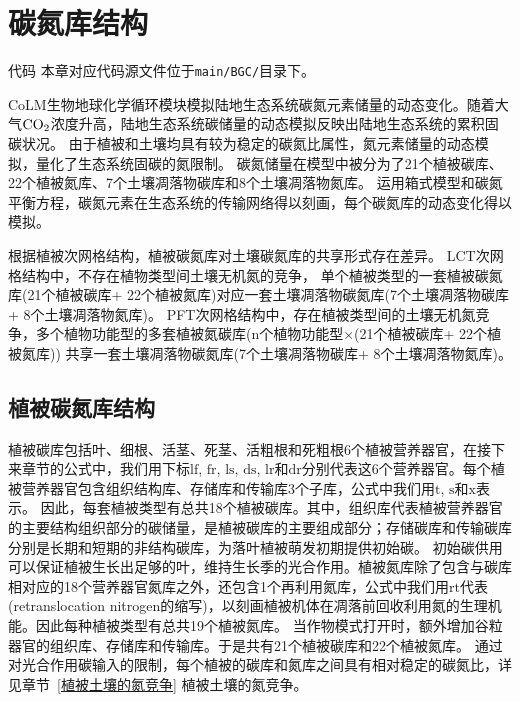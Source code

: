 \chapter{碳氮库结构}\label{碳氮库结构}
\begin{mymdframed}{代码}
  本章对应代码源文件位于\texttt{main/BGC/}目录下。
\end{mymdframed}

CoLM生物地球化学循环模块模拟陆地生态系统碳氮元素储量的动态变化。随着大气$\rm CO_2$浓度升高，陆地生态系统碳储量的动态模拟反映出陆地生态系统的累积固碳状况。
由于植被和土壤均具有较为稳定的碳氮比属性，氮元素储量的动态模拟，量化了生态系统固碳的氮限制。
碳氮储量在模型中被分为了21个植被碳库、22个植被氮库、7个土壤凋落物碳库和8个土壤凋落物氮库。
运用箱式模型和碳氮平衡方程，碳氮元素在生态系统的传输网络得以刻画，每个碳氮库的动态变化得以模拟。


根据植被次网格结构，植被碳氮库对土壤碳氮库的共享形式存在差异。
LCT次网格结构中，不存在植物类型间土壤无机氮的竞争，
单个植被类型的一套植被碳氮库(21个植被碳库+ 22个植被氮库)对应一套土壤凋落物碳氮库(7个土壤凋落物碳库+ 8个土壤凋落物氮库)。
PFT次网格结构中，存在植被类型间的土壤无机氮竞争，多个植物功能型的多套植被氮碳库(n个植物功能型×(21个植被碳库+ 22个植被氮库))
共享一套土壤凋落物碳氮库(7个土壤凋落物碳库+ 8个土壤凋落物氮库)。


\section{植被碳氮库结构}\label{植被碳氮库结构}
植被碳库包括叶、细根、活茎、死茎、活粗根和死粗根6个植被营养器官，在接下来章节的公式中，我们用下标${\mathrm {lf}}$, ${\mathrm {fr}}$, ${\mathrm {ls}}$, ${\mathrm {ds}}$, ${\mathrm {lr}}$和${\mathrm {dr}}$分别代表这6个营养器官。每个植被营养器官包含组织结构库、存储库和传输库3个子库，公式中我们用${\mathrm {t}}$, ${\mathrm {s}}$和${\mathrm {x}}$表示。
因此，每套植被类型有总共18个植被碳库。其中，组织库代表植被营养器官的主要结构组织部分的碳储量，是植被碳库的主要组成部分；存储碳库和传输碳库分别是长期和短期的非结构碳库，为落叶植被萌发初期提供初始碳。
初始碳供用可以保证植被生长出足够的叶，维持生长季的光合作用。植被氮库除了包含与碳库相对应的18个营养器官氮库之外，还包含1个再利用氮库，公式中我们用${\mathrm {rt}}$代表(retranslocation nitrogen的缩写)，以刻画植被机体在凋落前回收利用氮的生理机能。因此每种植被类型有总共19个植被氮库。
当作物模式打开时，额外增加谷粒器官的组织库、存储库和传输库。于是共有21个植被碳库和22个植被氮库。
通过对光合作用碳输入的限制，每个植被的碳库和氮库之间具有相对稳定的碳氮比，详见章节~\ref{植被土壤的氮竞争} 植被土壤的氮竞争。

